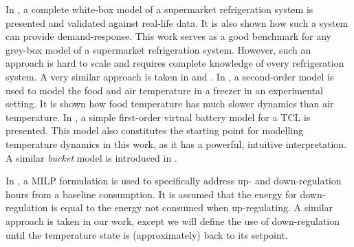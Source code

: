 In \cite{shafiei2013modeling}, a complete white-box model of a supermarket refrigeration system is presented and validated against real-life data. It is also shown how such a system can provide demand-response. This work serves as a good benchmark for any grey-box model of a supermarket refrigeration system. However, such an approach is hard to scale and requires complete knowledge of every refrigeration system. A very similar approach is taken in \cite{petersen2012eso2} and \cite{pedersen2013direct}. In \cite{pedersen2016improving}, a second-order model is used to model the food and air temperature in a freezer in an experimental setting. It is shown how food temperature has much slower dynamics than air temperature. In \cite{hao2014aggregate}, a simple first-order virtual battery model for a TCL is presented. This model also constitutes the starting point for modelling temperature dynamics in this work, as it has a powerful, intuitive interpretation. A similar \textit{bucket} model is introduced in \cite{petersen2013taxonomy}.


In \cite{de2019leveraging}, a MILP formulation is used to specifically address up- and down-regulation hours from a baseline consumption. It is assumed that the energy for down-regulation is equal to the energy not consumed when up-regulating. A similar approach is taken in our work, except we will define the use of down-regulation until the temperature state is (approximately) back to its setpoint.

